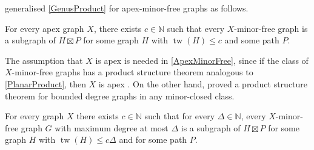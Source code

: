 \documentclass{patmorin}
\newcommand{\note}[2]{{\color{red}[#1:~#2]}}
\DeclareMathOperator{\tw}{tw}
\newcommand{\PP}{\mathcal{P}}
\renewcommand{\geq}{\geqslant}
\renewcommand{\leq}{\leqslant}
\begin{document}
\citet{dujmovic.joret.ea:planar} generalised \cref{GenusProduct} for apex-minor-free graphs as follows.

\begin{thm}
	\label{ApexMinorFree}
	For every apex graph $X$, there exists $c\in\mathbb{N}$ such that every $X$-minor-free graph is a subgraph of $H\boxtimes P$ for some graph $H$ with $\tw(H)\leq c$ and some path $P$.
\end{thm}

The assumption that $X$ is apex is needed in \cref{ApexMinorFree}, since if the class of $X$-minor-free graphs has a product structure theorem analogous to \cref{PlanarProduct}, then $X$ is apex \citep{dujmovic.joret.ea:planar}. On the other hand, \citet{DEMWW} proved a product structure theorem for bounded degree graphs in any minor-closed class.

\begin{thm}
	\label{MinorFreeDegree}
	For every graph $X$ there exists $c\in\mathbb{N}$ such that for every $\Delta\in\mathbb{N}$, every $X$-minor-free graph $G$ with maximum degree at most $\Delta$ is a subgraph of $H\boxtimes P$ for some graph $H$ with $\tw(H) \leq c\Delta$ and for some path $P$.
\end{thm}

%
%
%
%
\end{document}
